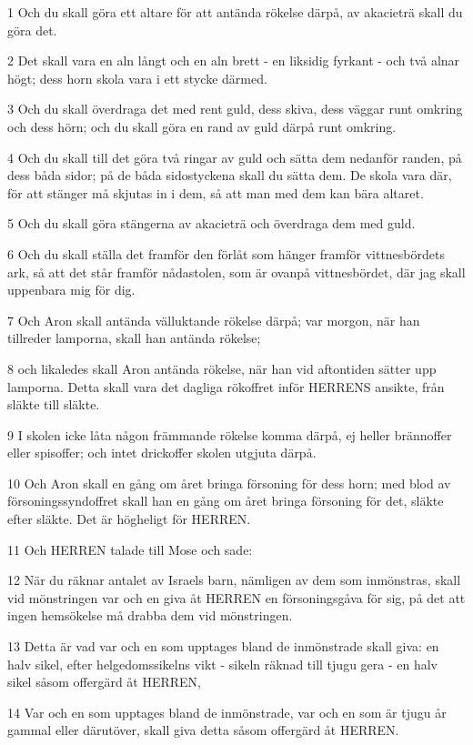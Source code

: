 \par 1 Och du skall göra ett altare för att antända rökelse därpå, av akacieträ skall du göra det.
\par 2 Det skall vara en aln långt och en aln brett - en liksidig fyrkant - och två alnar högt; dess horn skola vara i ett stycke därmed.
\par 3 Och du skall överdraga det med rent guld, dess skiva, dess väggar runt omkring och dess hörn; och du skall göra en rand av guld därpå runt omkring.
\par 4 Och du skall till det göra två ringar av guld och sätta dem nedanför randen, på dess båda sidor; på de båda sidostyckena skall du sätta dem. De skola vara där, för att stänger må skjutas in i dem, så att man med dem kan bära altaret.
\par 5 Och du skall göra stängerna av akacieträ och överdraga dem med guld.
\par 6 Och du skall ställa det framför den förlåt som hänger framför vittnesbördets ark, så att det står framför nådastolen, som är ovanpå vittnesbördet, där jag skall uppenbara mig för dig.
\par 7 Och Aron skall antända välluktande rökelse därpå; var morgon, när han tillreder lamporna, skall han antända rökelse;
\par 8 och likaledes skall Aron antända rökelse, när han vid aftontiden sätter upp lamporna. Detta skall vara det dagliga rökoffret inför HERRENS ansikte, från släkte till släkte.
\par 9 I skolen icke låta någon främmande rökelse komma därpå, ej heller brännoffer eller spisoffer; och intet drickoffer skolen utgjuta därpå.
\par 10 Och Aron skall en gång om året bringa försoning för dess horn; med blod av försoningssyndoffret skall han en gång om året bringa försoning för det, släkte efter släkte. Det är högheligt för HERREN.
\par 11 Och HERREN talade till Mose och sade:
\par 12 När du räknar antalet av Israels barn, nämligen av dem som inmönstras, skall vid mönstringen var och en giva åt HERREN en försoningsgåva för sig, på det att ingen hemsökelse må drabba dem vid mönstringen.
\par 13 Detta är vad var och en som upptages bland de inmönstrade skall giva: en halv sikel, efter helgedomssikelns vikt - sikeln räknad till tjugu gera - en halv sikel såsom offergärd åt HERREN,
\par 14 Var och en som upptages bland de inmönstrade, var och en som är tjugu år gammal eller därutöver, skall giva detta såsom offergärd åt HERREN.
